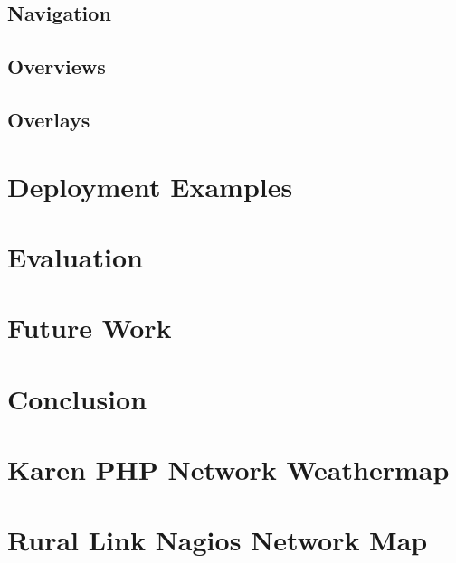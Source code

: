 \documentclass{article}
\begin{document}
\subsection{Navigation}
\label{sec:navigation}

\subsection{Overviews}
\label{sec:overviews}

\subsection{Overlays}
\label{sec:overlays}

\section{Deployment Examples}
\label{sec:deployment-examples}

\section{Evaluation}
\label{sec:evaluation}

\section{Future Work}
\label{sec:future-work}

\section{Conclusion}
\label{sec:conclusion}




\appendix
\appendixpage

\section{Karen PHP Network Weathermap}
\label{app:karenphp}

\section{Rural Link Nagios Network Map}
\label{app:crcnetnagios}
\end{document}
